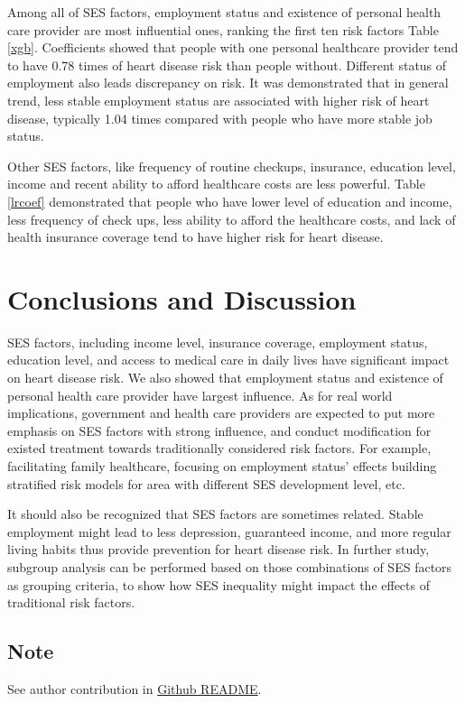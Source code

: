 \documentclass[11pt]{article}
\begin{document}
Among all of SES factors, employment status and existence of personal health care provider are most influential ones, ranking the first ten risk factors Table \ref{xgb}. Coefficients showed that people with one personal healthcare provider tend to have 0.78 times of heart disease risk than people without. Different status of employment also leads discrepancy on risk. It was demonstrated that in general trend, less stable employment status are associated with higher risk of heart disease, typically 1.04 times compared with people who have more stable job status. 

Other SES factors, like frequency of routine checkups, insurance, education level, income and recent ability to afford healthcare costs are less powerful. Table \ref{lrcoef} demonstrated that people who have lower level of education and income, less frequency of check ups, less ability to afford the healthcare costs, and lack of health insurance coverage tend to have higher risk for heart disease. 

\section{Conclusions and Discussion}
SES factors, including income level, insurance coverage, employment status, education level, and access to medical care in daily lives have significant impact on heart disease risk. We also showed that employment status and existence of personal health care provider have largest influence. As for real world implications, government and health care providers are expected to put more emphasis on SES factors with strong influence, and conduct modification for existed treatment towards traditionally considered risk factors. For example, facilitating family healthcare, focusing on employment status' effects building stratified risk models for area with different SES development level, etc. 

It should also be recognized that SES factors are sometimes related. Stable employment might lead to less depression, guaranteed income, and more regular living habits thus provide prevention for heart disease risk. In further study, subgroup analysis can be performed based on those combinations of SES factors as grouping criteria, to show how SES inequality might impact the effects of traditional risk factors. 
\vspace{-0.4cm}

\subsection*{Note}
See author contribution in \href{https://github.com/elizabethjchoe/biostat625-group5-project}{Github README}.
\end{document}
